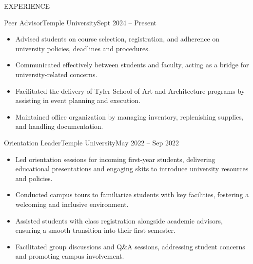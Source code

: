 \documentclass[]{mcdowellcv}
\begin{document}
	\begin{cvsection}{EXPERIENCE}
		\begin{cvsubsection}{Peer Advisor}{Temple University}{Sept 2024 -- Present}			
			\begin{itemize}
				\item Advised students on course selection, registration, and adherence on university policies, deadlines and procedures.
				\item Communicated effectively between students and faculty, acting as a bridge for university-related concerns.
				\item Facilitated the delivery of Tyler School of Art and Architecture programs by assisting in event planning and execution.
				\item Maintained office organization by managing inventory, replenishing supplies, and handling documentation.
			\end{itemize}
		\end{cvsubsection}

		\begin{cvsubsection}{Orientation Leader}{Temple University}{May 2022 -- Sep 2022}			
			\begin{itemize}
				\item Led orientation sessions for incoming first-year students, delivering educational presentations and engaging skits to introduce university resources and policies.
				\item Conducted campus tours to familiarize students with key facilities, fostering a welcoming and inclusive environment.
				\item Assisted students with class registration alongside academic advisors, ensuring a smooth transition into their first semester.
				\item Facilitated group discussions and Q\&A sessions, addressing student concerns and promoting campus involvement.
			\end{itemize}
		\end{cvsubsection}
		
	\end{cvsection}
\end{document}
